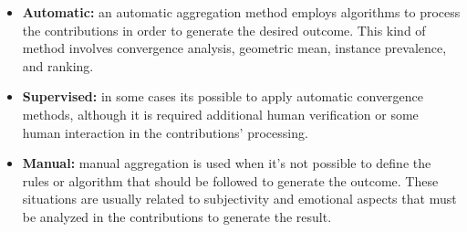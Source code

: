 \begin{itemize}

\item{\textbf{Automatic:}} an automatic aggregation method employs algorithms to process the contributions in order to generate the desired outcome. This kind of method involves convergence analysis, geometric mean, instance prevalence, and ranking. 

\item{\textbf{Supervised:}} in some cases its possible to apply automatic convergence methods, although it is required additional human verification or some human interaction in the contributions' processing. 

\item{\textbf{Manual:}} manual aggregation is used when it's not possible to define the rules or algorithm that should be followed to generate the outcome. These situations are usually related to subjectivity and emotional aspects that must be analyzed in the contributions to generate the result.

\end{itemize}
